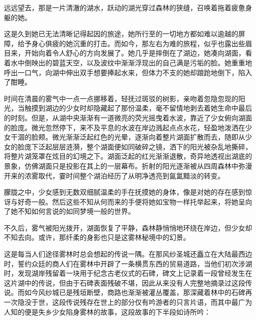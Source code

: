 

远远望去，那是一片清澈的湖水，跃动的湖光穿过森林的狭缝，召唤着拖着疲惫身躯的她。

这是久到她已无法清晰记得起因的旅途，她所行至的一切地方都如难以逾越的屏障，给予身心俱疲的她沉重的打击。而如今，那左右为难的旅程，似乎也露出些眉目来，开始向着令人舒心的方向发展了。她几乎是摔倒在了湖边，她凑向湖面，看着水中倒映出的碧蓝天空，以及波纹中渐渐浮现出的自己满是污垢的脸。她重重地呼出一口气，向湖中伸出双手想要捧起水来，但体力不支的她却踉跄地倒下，陷入了酣睡。

时间在清晨的雾气中一点一点挪移着，轻抚过斑驳的树影，亲吻着忽隐忽现的阳光，当触摸到湖边的少女时却隐藏起了那份温柔，毫不留情地剥去着她生命中最后的时刻。但是，从湖中央渐渐有一道微亮的荧光摇曳着水波，靠近了少女俯向湖面的脸庞。微光忽然停下，来不及平息的水波在岸边溅起点点水花，轻盈地泼洒在少女干涸的脸颊。微光渐渐泛起红色的光晕，逐渐向着整片湖面扩散而去，随即从少女的脸庞下泛起层层涟漪，整个湖面便如同破碎之镜，洒下的阳光被杂乱地撕碎，将整片湖笼罩在炫目的幻境之下。湖面泛起的红光渐渐退散，奇异地透视出湖底的景象，仿佛湖面只是投影在其上的一层幕布。折射的阳光逐渐被从四周森林中弥漫开来的浓雾取代，霎时间整个湖泊经历了从明净透亮到氤氲黯淡的转变。

朦胧之中，少女感到无数双细腻温柔的手在抚摸她的身体，像是对她的存在感到惊讶与好奇一般。然后这些不知从何而来的手便将她如宝物一样托举起来，将她呈向了她不知如何言说的如同梦境一般的世界。

不久后，雾气被阳光拨开，湖面恢复了平静，森林静悄悄地环绕在岸边，但少女却不知去向。或许，那纤柔的身影也只是这雾林秘境中的幻景。

这是每当人们途径雾林时总会想起的传说一隅。在那风纱圣城还矗立在大陆最西边时，誓约众廷的商人们在雾林中开辟了一条横贯东西的贸易道路，当他们初次涉湖时，发现湖岸残留着一块用于纪念古老仪式的石碑，碑文上记录着一段曾经发生在这片湖中的传说，但由于石碑表面残破不堪，因此从来没有人完整地摘录过这段传说。而如今风纱城已是残垣断壁，商路也渐渐被灌丛覆盖，那深藏着林中的石碑再一次隐没于世，这段传说残存在世上的部分仅有吟游者的只言片语，而其中最广为人知的便是失乡少女陷身雾林的故事，这段故事的下半段如诗所吟：

